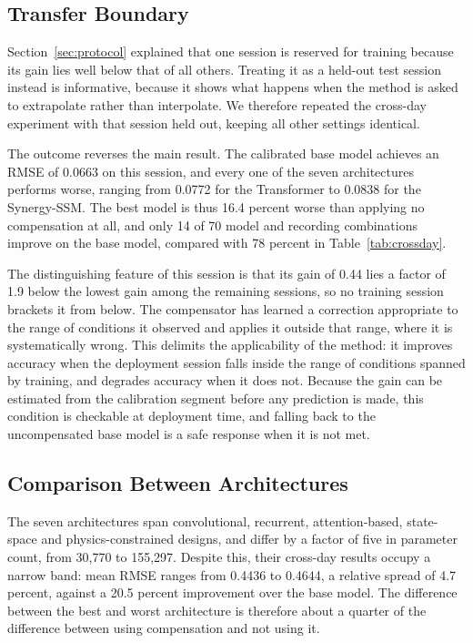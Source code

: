 \subsection{Transfer Boundary}
\label{sec:extrapolation}

Section~\ref{sec:protocol} explained that one session is reserved for training
because its gain lies well below that of all others. Treating it as a held-out
test session instead is informative, because it shows what happens when the
method is asked to extrapolate rather than interpolate. We therefore repeated
the cross-day experiment with that session held out, keeping all other settings
identical.

The outcome reverses the main result. The calibrated base model achieves an RMSE
of 0.0663 on this session, and every one of the seven architectures performs
worse, ranging from 0.0772 for the Transformer to 0.0838 for the Synergy-SSM.
The best model is thus 16.4 percent worse than applying no compensation at all,
and only 14 of 70 model and recording combinations improve on the base model,
compared with 78 percent in Table~\ref{tab:crossday}.

The distinguishing feature of this session is that its gain of 0.44 lies a factor
of 1.9 below the lowest gain among the remaining sessions, so no training session
brackets it from below. The compensator has learned a correction appropriate to
the range of conditions it observed and applies it outside that range, where it
is systematically wrong. This delimits the applicability of the method: it
improves accuracy when the deployment session falls inside the range of
conditions spanned by training, and degrades accuracy when it does not. Because
the gain can be estimated from the calibration segment before any prediction is
made, this condition is checkable at deployment time, and falling back to the
uncompensated base model is a safe response when it is not met.

\subsection{Comparison Between Architectures}
\label{sec:architecture}

The seven architectures span convolutional, recurrent, attention-based,
state-space and physics-constrained designs, and differ by a factor of five in
parameter count, from 30{,}770 to 155{,}297. Despite this, their cross-day
results occupy a narrow band: mean RMSE ranges from 0.4436 to 0.4644, a relative
spread of 4.7 percent, against a 20.5 percent improvement over the base model.
The difference between the best and worst architecture is therefore about a
quarter of the difference between using compensation and not using it.


